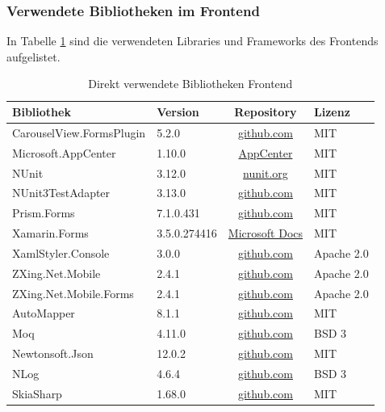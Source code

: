 \subsubsection{Verwendete Bibliotheken im Frontend}
In Tabelle \ref{tab:verwendete-libraries-frontend} sind die verwendeten Libraries und Frameworks des Frontends aufgelistet.
\begin{table}[!h]
	\centering
	\begin{tabular}{| l | l | c | l |}
		\hline
		\textbf{Bibliothek} & \textbf{Version} & \textbf{Repository} & \textbf{Lizenz}\\
		\hline
		CarouselView.FormsPlugin & 5.2.0 & \href{https://github.com/alexrainman/CarouselView}{github.com} & MIT \\
		Microsoft.AppCenter & 1.10.0 & \href{https://visualstudio.microsoft.com/app-center/}{AppCenter} & MIT \\
		NUnit & 3.12.0 & \href{http://nunit.org}{nunit.org} & MIT\\
		NUnit3TestAdapter & 3.13.0 & \href{https://github.com/nunit/docs/wiki/Visual-Studio-Test-Adapter}{github.com} & MIT\\
		Prism.Forms & 7.1.0.431 & \href{https://github.com/PrismLibrary/Prism}{github.com} & MIT \\
		Xamarin.Forms & 3.5.0.274416 & \href{https://docs.microsoft.com/en-us/xamarin/xamarin-forms/}{Microsoft Docs} & MIT \\
		XamlStyler.Console & 3.0.0 & 
		\href{https://github.com/Xavalon/XamlStyler}{github.com} & Apache 2.0\\
		ZXing.Net.Mobile & 2.4.1 & \href{http://github.com/Redth/ZXing.Net.Mobile}{github.com} & Apache 2.0\\
		ZXing.Net.Mobile.Forms & 2.4.1 &
		\href{http://github.com/Redth/ZXing.Net.Mobile}{github.com} & Apache 2.0\\
		AutoMapper & 8.1.1 & \href{https://github.com/AutoMapper/AutoMapper}{github.com} & MIT\\
		Moq & 4.11.0 & \href{https://github.com/moq/moq4}{github.com} & BSD 3\\
		Newtonsoft.Json & 12.0.2 & \href{https://github.com/JamesNK/Newtonsoft.Json}{github.com} & MIT\\
		NLog & 4.6.4 & \href{https://github.com/NLog/NLog/}{github.com} & BSD 3\\
		SkiaSharp & 1.68.0 & \href{https://github.com/mono/SkiaSharp}{github.com} & MIT\\
		
		\hline
		
	\end{tabular}
	\caption{Direkt verwendete Bibliotheken Frontend}
	\label{tab:verwendete-libraries-frontend}
\end{table}


